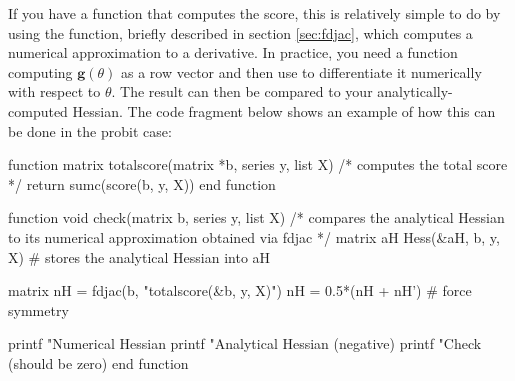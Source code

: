 If you have a function that computes the score, this is relatively
simple to do by using the  function, briefly described in
section \ref{sec:fdjac}, which computes a numerical approximation to a
derivative. In practice, you need a function computing
$\mathbf{g}(\theta)$ as a row vector and then use  to
differentiate it numerically with respect to $\theta$. The result can
then be compared to your analytically-computed Hessian. The code
fragment below shows an example of how this can be done in the probit
case:
\begin{code}
function matrix totalscore(matrix *b, series y, list X) 
    /* computes the total score */
    return sumc(score(b, y, X))
end function

function void check(matrix b, series y, list X)
    /* compares the analytical Hessian to its numerical
    approximation obtained via fdjac */
    matrix aH
    Hess(&aH, b, y, X) # stores the analytical Hessian into aH
    
    matrix nH = fdjac(b, "totalscore(&b, y, X)")
    nH = 0.5*(nH + nH') # force symmetry
    
    printf "Numerical Hessian\n%
    printf "Analytical Hessian (negative)\n%
    printf "Check (should be zero)\n%
end function
\end{code}


